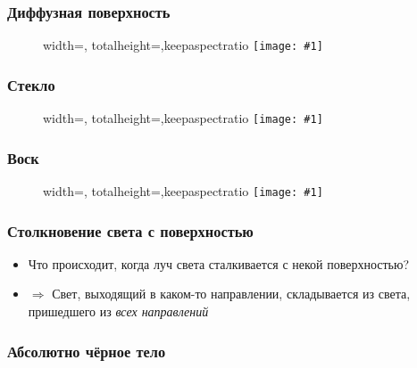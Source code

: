 \documentclass[handout,10pt]{beamer}
\newcommand{\slideimage}[1]{
  \begin{figure}
    \begin{adjustbox}{width=\textwidth, totalheight=\textheight-2\baselineskip-2\baselineskip,keepaspectratio}
      \texttt{[image: \#1]}
    \end{adjustbox}
  \end{figure}
}
\begin{document}

\begin{frame}[fragile]
\frametitle{Диффузная поверхность}
\slideimage{diffuse.png}
\end{frame}


\begin{frame}[fragile]
\frametitle{Стекло}
\slideimage{glass.png}
\end{frame}


\begin{frame}[fragile]
\frametitle{Воск}
\slideimage{wax.png}
\end{frame}

\begin{frame}[fragile]
\frametitle{Столкновение света с поверхностью}
\begin{itemize}
\item Что происходит, когда луч света сталкивается с некой поверхностью?
\pause
\item \begin{math}\Longrightarrow\end{math} Свет, выходящий в каком-то направлении, складывается из света, пришедшего из \textit{всех направлений}
\end{itemize}
\end{frame}

\begin{frame}[fragile]
\frametitle{Абсолютно чёрное тело}
\begin{center}
\end{center}
\end{frame}
\end{document}

